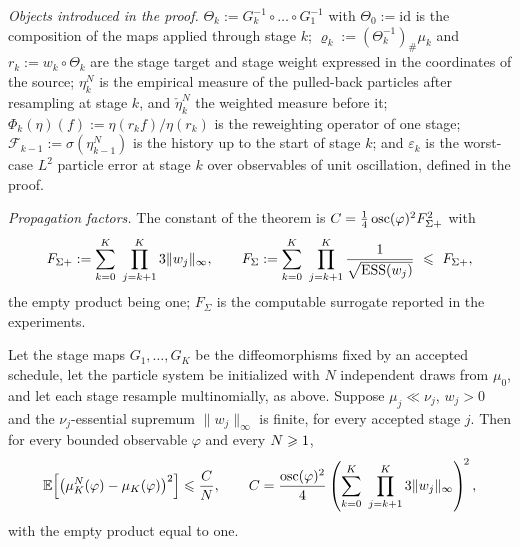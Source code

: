 \documentclass{article}
\begin{document}
{\emph{Objects introduced in the proof.} $\Theta_k:=G_k^{-1}\circ\dots\circ G_1^{-1}$ with $\Theta_0:=\mathrm{id}$ is the composition of the maps applied through stage $k$; $\varrho_k:=(\Theta_k^{-1})_{\#}\mu_k$ and $r_k:=w_k\circ\Theta_k$ are the stage target and stage weight expressed in the coordinates of the source; $\eta_k^N$ is the empirical measure of the pulled-back particles after resampling at stage $k$, and $\check\eta_k^N$ the weighted measure before it; $\Phi_k(\eta)(f):=\eta(r_kf)/\eta(r_k)$ is the reweighting operator of one stage; $\mathcal F_{k-1}:=\sigma(\eta_{k-1}^N)$ is the history up to the start of stage $k$; and $\varepsilon_k$ is the worst-case $L^2$ particle error at stage $k$ over observables of unit oscillation, defined in the proof.

\emph{Propagation factors.} The constant of the theorem is $C=\tfrac14\operatorname{osc}(\varphi)^2F_{\Sigma+}^2$ with
\begin{equation}
    F_{\Sigma+}:=\sum_{k=0}^{K}\ \prod_{j=k+1}^{K}3\lVert w_j\rVert_\infty,
    \qquad
    F_{\Sigma}:=\sum_{k=0}^{K}\ \prod_{j=k+1}^{K}\frac{1}{\sqrt{\ESS(w_j)}}\ \Le\ F_{\Sigma+},
    \label{eq: local-factors}
\end{equation}
the empty product being one; $F_\Sigma$ is the computable surrogate reported in the experiments.
}


\begin{theorem}
\label{thm:prop}
{\color{red}Let the stage maps $G_1,\dots,G_K$ be the diffeomorphisms fixed by an accepted schedule, let the particle system be initialized with $N$ independent draws from $\mu_0$, and let each stage resample multinomially, as above.} Suppose {\color{red}$\mu_j\ll\nu_j$,} $w_j>0$ and the $\nu_j$-essential supremum $\lVert w_j \rVert_\infty$ is finite, for every accepted stage $j$. Then for every bounded observable $\varphi$ and every $N \geqslant 1$,
\begin{equation}
    \mathbb E\Bigl[\bigl(\mu_K^N(\varphi) - \mu_K(\varphi)\bigr)^{2}\Bigr]
    \leqslant \frac{C}{N},
    \qquad
    C = \frac{\operatorname{osc}(\varphi)^{2}}{4}
    \left(\sum_{k=0}^{K}\ \prod_{j=k+1}^{K} 3\lVert w_j \rVert_\infty\right)^{\!2},
    \label{eq: propagation-bound}
\end{equation}
with the empty product equal to one.
\end{theorem}
\end{document}
